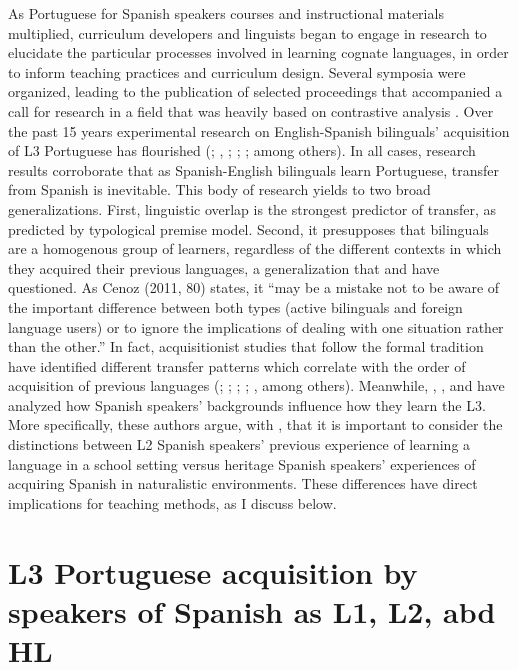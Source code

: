 \documentclass[output=paper]{../langscibook}
\begin{document}
As Portuguese for Spanish speakers courses and instructional materials multiplied, curriculum developers and linguists began to engage in research to elucidate the particular processes involved in learning cognate languages, in order to inform teaching practices and curriculum design. Several symposia were organized, leading to the publication of selected proceedings \citep{SimoesEtAl2004,WiedemannScaramucci2008} that accompanied a call for research in a field that was heavily based on contrastive analysis \citep{Carvalho2002}. Over the past 15 years experimental research on English-Spanish bilinguals’ acquisition of L3 Portuguese has flourished (\citealt{Allegro2010}; \citealt{Bailey2013}, \citealt{FeidenEtAl2014}; \citealt{Silva2015}; \citealt{TrudeTokowicz2011}; among others). In all cases, research results corroborate that as Spanish-English bilinguals learn Portuguese, transfer from Spanish is inevitable. This body of research yields to two broad generalizations. First, linguistic overlap is the strongest predictor of transfer, as predicted by  typological premise model. Second, it presupposes that bilinguals are a homogenous group of learners, regardless of the different contexts in which they acquired their previous languages, a generalization that \citet{Carvalho2002} and \citet{Cenoz2011} have questioned. As Cenoz (2011, 80) states, it “may be a mistake not to be aware of the important difference between both types (active bilinguals and foreign language users) or to ignore the implications of dealing with one situation rather than the other.” In fact, acquisitionist studies that follow the formal tradition have identified different transfer patterns which correlate with the order of acquisition of previous languages (\citealt{CabrelliAmaroWrembel2016}; \citealt{ChildEtAl2017}; \citealt{Silva2015}; \citealt{GiancasproEtAl2015}; \citealt{Rothman2010}, among others). Meanwhile, \citet{CarvalhoSilva2006}, \citet{CarvalhoChild2018}, and \citet{KoikeFlanzer2004} have analyzed how Spanish speakers’ backgrounds influence how they learn the L3. More specifically, these authors argue, with \citet{Cenoz2011}, that it is important to consider the distinctions between L2 Spanish speakers’ previous experience of learning a language in a school setting versus heritage Spanish speakers’ experiences of acquiring Spanish in naturalistic environments. These differences have direct implications for teaching methods, as I discuss below.

 \section{L3 Portuguese acquisition by speakers of Spanish as L1, L2, abd HL}
\end{document}
